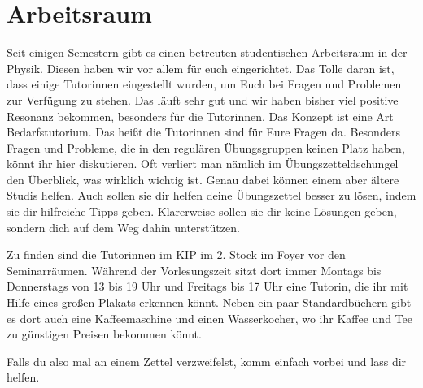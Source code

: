 \section{Arbeitsraum}
\label{sec:arbeitsraum}
Seit einigen Semestern gibt es einen betreuten studentischen Arbeitsraum in der Physik. Diesen haben wir vor allem für euch eingerichtet. Das Tolle daran ist, dass einige Tutorinnen eingestellt wurden, um Euch bei Fragen und Problemen zur Verfügung zu stehen. Das läuft sehr gut und wir haben bisher viel positive Resonanz bekommen, besonders für die Tutorinnen. Das Konzept ist eine Art Bedarfstutorium. Das heißt die Tutorinnen sind für Eure Fragen da. Besonders Fragen und Probleme, die in den regulären Übungsgruppen keinen Platz haben, könnt ihr hier diskutieren. Oft verliert man nämlich im Übungszetteldschungel den Überblick, was wirklich wichtig ist. Genau dabei können einem aber ältere Studis helfen. Auch sollen sie dir helfen deine Übungszettel besser zu lösen, indem sie dir hilfreiche Tipps geben. Klarerweise sollen sie dir keine Lösungen geben, sondern dich auf dem Weg dahin unterstützen.

Zu finden sind die Tutorinnen im KIP im 2. Stock im Foyer vor den Seminarräumen. Während der Vorlesungszeit sitzt dort immer Montags bis Donnerstags von 13 bis 19 Uhr und Freitags bis 17 Uhr eine Tutorin, die ihr mit Hilfe eines großen Plakats erkennen könnt. Neben ein paar Standardbüchern gibt es dort auch eine Kaffeemaschine und einen Wasserkocher, wo ihr Kaffee und Tee zu günstigen Preisen bekommen könnt.

Falls du also mal an einem Zettel verzweifelst, komm einfach vorbei und lass dir helfen.
